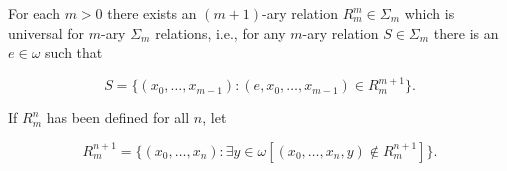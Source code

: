 For each $m > 0$ there exists an $(m+1)$-ary relation $R_m^m \in \Sigma_m$ which is universal for $m$-ary $\Sigma_m$ relations, i.e., for any $m$-ary relation $S \in \Sigma_m$ there is an $e \in \omega$ such that

$$S = \{(x_0, \ldots, x_{m-1}) : (e, x_0, \ldots, x_{m-1}) \in R_m^{m+1}\}.$$

If $R_m^n$ has been defined for all $n$, let

$$R_m^{n+1} = \{(x_0, \ldots, x_n) : \exists y \in \omega [(x_0, \ldots, x_n, y) \notin R_m^{n+1}]\}.$$
